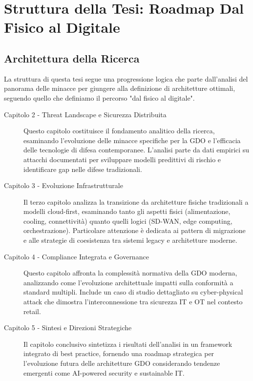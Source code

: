 \documentclass[12pt,a4paper,oneside]{book}
\begin{document}
\section{Struttura della Tesi: Roadmap Dal Fisico al Digitale}
\label{sec:struttura_tesi}

\subsection{Architettura della Ricerca}
\label{ssec:architettura_ricerca}

La struttura di questa tesi segue una progressione logica che parte dall'analisi del panorama delle minacce per giungere alla definizione di architetture ottimali, seguendo quello che definiamo il percorso "dal fisico al digitale".
\begin{description}
    \item[Capitolo 2 - Threat Landscape e Sicurezza Distribuita] Questo capitolo costituisce il fondamento analitico della ricerca, esaminando l'evoluzione delle minacce specifiche per la GDO e l'efficacia delle tecnologie di difesa contemporanee. L'analisi parte da dati empirici su attacchi documentati per sviluppare modelli predittivi di rischio e identificare gap nelle difese tradizionali.
    \item[Capitolo 3 - Evoluzione Infrastrutturale] Il terzo capitolo analizza la transizione da architetture fisiche tradizionali a modelli cloud-first, esaminando tanto gli aspetti fisici (alimentazione, cooling, connettività) quanto quelli logici (SD-WAN, edge computing, orchestrazione). Particolare attenzione è dedicata ai pattern di migrazione e alle strategie di coesistenza tra sistemi legacy e architetture moderne.
    \item[Capitolo 4 - Compliance Integrata e Governance] Questo capitolo affronta la complessità normativa della GDO moderna, analizzando come l'evoluzione architettuale impatti sulla conformità a standard multipli. Include un caso di studio dettagliato su cyber-physical attack che dimostra l'interconnessione tra sicurezza IT e OT nel contesto retail.
    \item[Capitolo 5 - Sintesi e Direzioni Strategiche] Il capitolo conclusivo sintetizza i risultati dell'analisi in un framework integrato di best practice, fornendo una roadmap strategica per l'evoluzione futura delle architetture GDO considerando tendenze emergenti come AI-powered security e sustainable IT.
\end{description}
\end{document}
